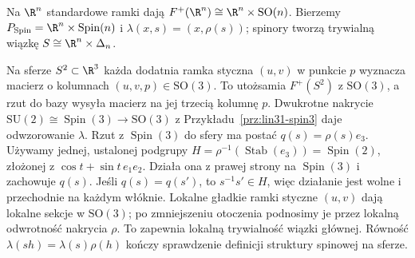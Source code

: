 \begin{przyklad}
Na $\R^n$ standardowe ramki dają
$F^+(\R^n)\cong\R^n\times\mathrm{SO}(n)$.
Bierzemy
$P_{\mathrm{Spin}}=\R^n\times\operatorname{Spin}(n)$
i $\lambda(x,s)=(x,\rho(s))$; spinory
tworzą trywialną wiązkę
$S\cong\R^n\times\Delta_n$.

Na sferze $S^2\subset\R^3$ każda dodatnia
ramka styczna $(u,v)$ w punkcie $p$ wyznacza
macierz o kolumnach $(u,v,p)\in\mathrm{SO}(3)$.
To utożsamia $F^+(S^2)$ z $\mathrm{SO}(3)$,
a rzut do bazy wysyła macierz na jej trzecią
kolumnę $p$. Dwukrotne nakrycie
$\mathrm{SU}(2)\cong\operatorname{Spin}(3)
\to\mathrm{SO}(3)$ z
Przykładu~\ref{prz:lin31-spin3} daje odwzorowanie $\lambda$.
Rzut z $\operatorname{Spin}(3)$ do sfery ma postać
$q(s)=\rho(s)e_3$. Używamy jednej, ustalonej podgrupy
$H=\rho^{-1}(\operatorname{Stab}(e_3))=\operatorname{Spin}(2)$,
złożonej z $\cos t+\sin t\,e_1e_2$. Działa ona z prawej strony
na $\operatorname{Spin}(3)$ i zachowuje $q(s)$.
Jeśli $q(s)=q(s')$, to $s^{-1}s'\in H$, więc działanie jest
wolne i przechodnie na każdym włóknie. Lokalne gładkie ramki
styczne $(u,v)$ dają lokalne sekcje w $\mathrm{SO}(3)$;
po zmniejszeniu otoczenia podnosimy je przez lokalną odwrotność
nakrycia $\rho$. To zapewnia lokalną trywialność wiązki głównej.
Równość $\lambda(sh)=\lambda(s)\rho(h)$ kończy sprawdzenie
definicji struktury spinowej na sferze.
\end{przyklad}

